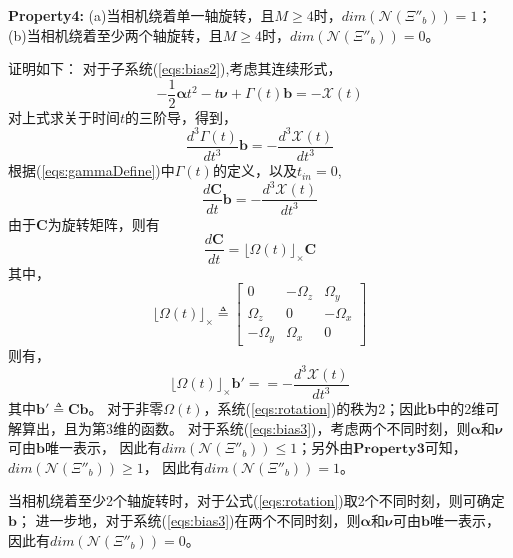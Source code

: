 \documentclass{article}
\begin{document}
\par
\textbf{Property4: }(a)当相机绕着单一轴旋转，且$M\geqslant 4$时，$dim(\mathcal{N}(\Xi''_b))=1$；
(b)当相机绕着至少两个轴旋转，且$M\geqslant 4$时，$dim(\mathcal{N}(\Xi''_b))=0$。
\par
证明如下：
对于子系统(\ref{eqs:bias2}),考虑其连续形式，
\begin{equation}\label{eqs:bias3}
    -\frac{1}{2}\mathbf{\alpha}t^2-t\mathbf{\nu}+\Gamma(t)\textbf{b}=-\mathcal{X}(t)
\end{equation}
对上式求关于时间$t$的三阶导，得到，
\begin{equation}
    \frac{d^3\Gamma(t)}{dt^3}\textbf{b}=-\frac{d^3\mathcal{X}(t)}{dt^3}
\end{equation}
根据(\ref{eqs:gammaDefine})中$\Gamma(t)$的定义，以及$t_{in}=0$,
\begin{equation}
    \frac{d\textbf{C}}{dt}\textbf{b}=-\frac{d^3\mathcal{X}(t)}{dt^3}
\end{equation}
由于$\textbf{C}$为旋转矩阵，则有
\begin{equation}
    \frac{d\textbf{C}}{dt}=\lfloor\Omega(t)\rfloor_{\times}\textbf{C}
\end{equation}
其中，
\begin{equation}
    \lfloor\Omega(t)\rfloor_{\times}\triangleq
    \left[\begin{array}{ccc}
        0&-\Omega_z&\Omega_y\\
        \Omega_z&0&-\Omega_x\\
        -\Omega_y&\Omega_x&0
    \end{array}\right]
\end{equation}
则有，
\begin{equation}\label{eqs:rotation}
    \lfloor\Omega(t)\rfloor_{\times}\textbf{b}'==-\frac{d^3\mathcal{X}(t)}{dt^3}
\end{equation}
其中$\textbf{b}'\triangleq \textbf{Cb}$。
对于非零$\Omega(t)$，系统(\ref{eqs:rotation})的秩为2；因此$\textbf{b}$中的2维可解算出，且为第3维的函数。
对于系统(\ref{eqs:bias3})，考虑两个不同时刻，则$\mathbf{\alpha}$和$\mathbf{\nu}$可由$\textbf{b}$唯一表示，
因此有$dim(\mathcal{N}(\Xi''_b))\leqslant 1$；另外由$\textbf{Property3}$可知，$dim(\mathcal{N}(\Xi''_b))\geqslant 1$，
因此有$dim(\mathcal{N}(\Xi''_b))=1$。
\par
当相机绕着至少2个轴旋转时，对于公式(\ref{eqs:rotation})取2个不同时刻，则可确定$\textbf{b}$；
进一步地，对于系统(\ref{eqs:bias3})在两个不同时刻，则$\mathbf{\alpha}$和$\mathbf{\nu}$可由$\textbf{b}$唯一表示，
因此有$dim(\mathcal{N}(\Xi''_b))=0$。
\end{document}

